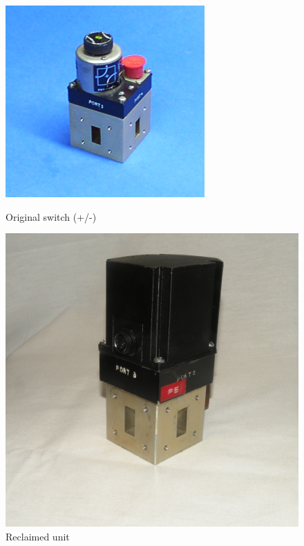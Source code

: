 \documentclass[12pt]{article}
\begin{document}
\begin{figure}[tb]
  \centering
  \begin{minipage}[b]{0.4\textwidth}
    \centering
    \includegraphics[width=\textwidth]{wr-90-s1.jpg}
    \caption{\label{f_wg_switch_orig}Original switch (+/-)}  
  \end{minipage}
  \begin{minipage}[b]{0.4\textwidth}
    \centering
    \includegraphics[width=\textwidth]{WGFinal.jpg}
    \caption{\label{f_wg_switch_new}Reclaimed unit}      
  \end{minipage}
  \end{figure}
\end{document}
